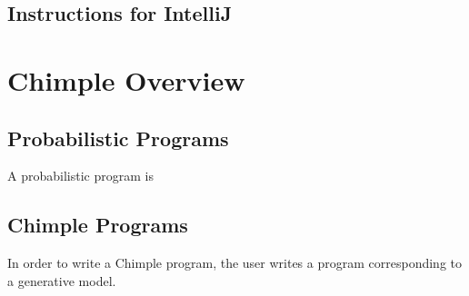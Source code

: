 \subsection{Instructions for IntelliJ}

\section{Chimple Overview}

\subsection{Probabilistic Programs}
A probabilistic program is

\subsection{Chimple Programs}

In order to write a Chimple program, the user writes a program
corresponding to a generative model.
